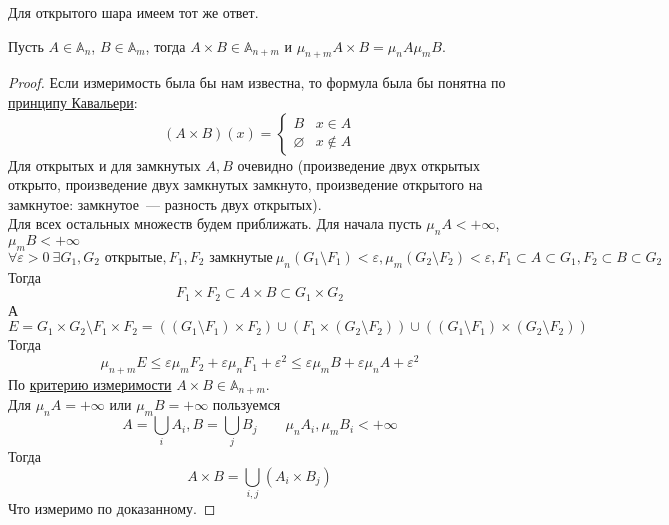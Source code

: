 \documentclass{article}
\let\eps\varepsilon
\begin{document}
    \begin{remark}
        Для открытого шара имеем тот же ответ.
    \end{remark}
    \begin{theorem}
        Пусть $A\in\mathbb A_n$, $B\in\mathbb A_m$, тогда $A\times B\in\mathbb A_{n+m}$ и $\mu_{n+m}A\times B=\mu_nA\mu_mB$.
    \end{theorem}
    \begin{proof}
        Если измеримость была бы нам известна, то формула была бы понятна по \hyperref[Принцип Кавальери]{принципу Кавальери}:
        $$
        (A\times B)(x)=\begin{cases}
            B&x\in A\\\varnothing&x\notin A
        \end{cases}
        $$
        Для открытых и для замкнутых $A,B$ очевидно (произведение двух открытых открыто, произведение двух замкнутых замкнуто, произведение открытого на замкнутое: замкнутое~--- разность двух открытых).\\
        Для всех остальных множеств будем приближать. Для начала пусть $\mu_nA<+\infty$, $\mu_mB<+\infty$
        $$
        \forall\eps>0~\exists G_1,G_2\text{ открытые},F_1,F_2\text{ замкнутые}~\mu_n(G_1\setminus F_1)<\eps,\mu_m(G_2\setminus F_2)<\eps,F_1\subset A\subset G_1,F_2\subset B\subset G_2
        $$
        Тогда
        $$
        F_1\times F_2\subset A\times B\subset G_1\times G_2
        $$
        А
        $$
        E=G_1\times G_2\setminus F_1\times F_2=((G_1\setminus F_1)\times F_2)\cup(F_1\times(G_2\setminus F_2))\cup((G_1\setminus F_1)\times(G_2\setminus F_2))
        $$
        Тогда
        $$
        \mu_{n+m}E\leqslant\eps\mu_mF_2+\eps\mu_nF_1+\eps^2\leqslant\eps\mu_mB+\eps\mu_nA+\eps^2
        $$
        По \hyperref[Критерий измеримости]{критерию измеримости} $A\times B\in\mathbb A_{n+m}$.\\
        Для $\mu_n A=+\infty$ или $\mu_m B=+\infty$ пользуемся
        $$
        A=\bigcup\limits_iA_i,B=\bigcup\limits_jB_j\qquad \mu_n A_i,\mu_m B_i<+\infty
        $$
        Тогда
        $$
        A\times B=\bigcup\limits_{i,j}(A_i\times B_j)
        $$
        Что измеримо по доказанному.
    \end{proof}
\end{document}
